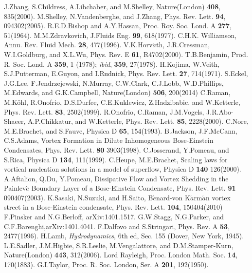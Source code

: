 \documentclass[12pt,a4paper]{jbook}
\begin{document}
\begin{thebibliography}{81}
 J.Zhang, S.Childress, A.Libchaber, and M.Shelley, Nature(London) {\bf 408}, 835(2000).
 M.Shelley, N.Vandenberghe, and J.Zhang, Phys. Rev. Lett. {\bf 94}, 094302(2005).
 R.E.D.Bishop and A.Y.Hassan, Proc. Roy. Soc. Lond. A {\bf 277}, 51(1964).
 M.M.Zdravkovich, J.Fluids Eng. {\bf 99}, 618(1977).
 C.H.K. Williamson, Annu. Rev. Fluid Mech. {\bf 28}, 477(1996).
 V.K.Horv$\acute{a}$th, J.R.Cressman, W.I.Goldburg, and X.L.Wu, Phys. Rev. E {\bf 61}, R4702(2000).
 T.B.Benjamin, Prod. R. Soc. Lond. A {\bf 359}, 1 (1978); {\it ibid}, {\bf 359}, 27(1978).
 H.Kojima, W.Veith, S.J.Putterman, E.Guyon, and I.Rudnick, Phys. Rev. Lett. {\bf 27}, 714(1971).
 S.Eckel, J.G.Lee, F.Jendrzejewski, N.Murray, C.W.Clark, C.J.Lobb, W.D.Phillips, M.Edwards, and G.K.Campbell, Nature(London) {\bf 506}, 200(2014)
 C.Raman, M.K\"{o}hl, R.Onofrio, D.S.Durfee, C.E.Kuklewicz, Z.Hadzibabic, and W.Ketterle, Phys. Rev. Lett. {\bf 83}, 2502(1999).
 R.Onofrio, C.Raman, J.M.Vogels, J.R.Abo-Shaeer, A.P.Chikkatur, and W.Ketterle, Phys. Rev. Lett. {\bf 85}, 2228(2000).
 C.Nore, M.E.Brachet, and S.Fauve, Physica D {\bf 65}, 154(1993).
 B.Jackson, J.F.McCann, C.S.Adams, Vortex Formation in Dilute Inhomogeneous Bose-Einstein Condensates, Phys. Rev. Lett. {\bf 80} 3903(1998).
 C.Josserand, Y.Pomeau, and S.Rica, Physica D {\bf 134}, 111(1999).
 C.Heupe, M.E.Brachet, Scaling laws for vortical nucleation solutions in a model of superflow, Physica D {\bf 140} 126(2000).
 A.Aftalion, Q.Du, Y.Pomeau, Dissipative Flow and Vortex Shedding in the Painlev$\acute{e}$ Boundary Layer of a Bose-Einstein Condensate, Phys. Rev. Lett. {\bf 91} 090407(2003).
 K.Sasaki, N.Suzuki, and H.Saito, B$\acute{e}$nard-von K$\acute{a}$rm$\acute{a}$n vortex street in a Bose-Einstein condensate, Phys. Rev. Lett. {\bf 104}, 150404(2010)
 F.Pinsker and N.G.Berloff, arXiv:1401.1517.
 G.W.Stagg, N.G.Parker, and C.F.Barenghi,arXiv:1401.4041.
 F.Dalfovo and S.Stringari, Phys. Rev. A {\bf 53}, 2477(1996).
 H.Lamb, {\it Hydrodynamics}, 6th ed, Sec. 155 (Dover, New York, 1945).
 L.E.Sadler, J.M.Higbie, S.R.Leslie, M.Vengalattore, and D.M.Stamper-Kurn, Nature(London) {\bf 443}, 312(2006).
 Lord Rayleigh, Proc. London Math. Soc. {\bf 14}, 170(1883).
 G.I.Taylor, Proc. R. Soc. London, Ser. A {\bf 201}, 192(1950).

\end{thebibliography}
\end{document}
